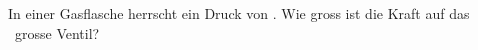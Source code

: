 In einer Gasflasche herrscht ein Druck von \pgfO. Wie gross ist die Kraft auf das \AgfO\ grosse Ventil?
